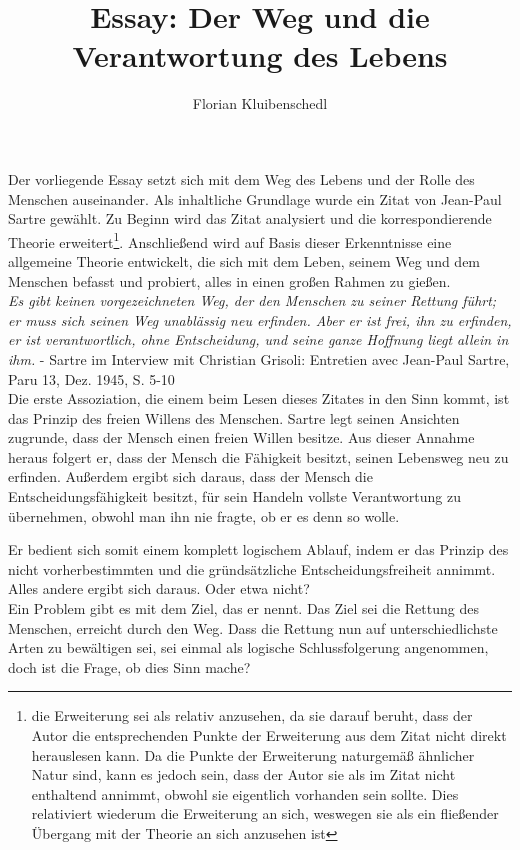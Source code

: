 \documentclass[12pt,a4paper,twoside]{article}
\author{Florian Kluibenschedl}
\title{Essay: Der Weg und die Verantwortung des Lebens}
\begin{document}
  \maketitle
  
  Der vorliegende Essay setzt sich mit dem Weg des Lebens und der Rolle des Menschen auseinander. Als inhaltliche Grundlage wurde ein Zitat von Jean-Paul Sartre gewählt. Zu Beginn wird das Zitat analysiert und die korrespondierende Theorie erweitert\footnote{die Erweiterung sei als relativ anzusehen, da sie darauf beruht, dass der Autor die entsprechenden Punkte der Erweiterung aus dem Zitat nicht direkt herauslesen kann. Da die Punkte der Erweiterung naturgemäß ähnlicher Natur sind, kann es jedoch sein, dass der Autor sie als im Zitat nicht enthaltend annimmt, obwohl sie eigentlich vorhanden sein sollte. Dies relativiert wiederum die Erweiterung an sich, weswegen sie als ein fließender Übergang mit der Theorie an sich anzusehen ist}. Anschließend wird auf Basis dieser Erkenntnisse eine allgemeine Theorie entwickelt, die sich mit dem Leben, seinem Weg und dem Menschen befasst und probiert, alles in einen großen Rahmen zu gießen. \\
  
  \textit{\glqq Es gibt keinen vorgezeichneten Weg, der den Menschen zu seiner Rettung führt; er muss sich seinen Weg unablässig neu erfinden. Aber er ist frei, ihn zu erfinden, er ist verantwortlich, ohne Entscheidung, und seine ganze Hoffnung liegt allein in ihm.\grqq} - Sartre im Interview mit Christian Grisoli: \glqq Entretien avec Jean-Paul Sartre\grqq , Paru 13, Dez. 1945, S. 5-10 \\
  
  Die erste Assoziation, die einem beim Lesen dieses Zitates in den Sinn kommt, ist das Prinzip des freien Willens des Menschen. Sartre legt seinen Ansichten zugrunde, dass der Mensch einen freien Willen besitze. Aus dieser Annahme heraus folgert er, dass der Mensch die Fähigkeit besitzt, seinen Lebensweg neu zu erfinden. Außerdem ergibt sich daraus, dass der Mensch die Entscheidungsfähigkeit besitzt, für sein Handeln vollste Verantwortung zu übernehmen, obwohl man ihn nie fragte, ob er es denn so wolle. 
  
  Er bedient sich somit einem komplett logischem Ablauf, indem er das Prinzip des nicht vorherbestimmten und die gründsätzliche Entscheidungsfreiheit annimmt. Alles andere ergibt sich daraus. Oder etwa nicht? \\
  
  Ein Problem gibt es mit dem Ziel, das er nennt. Das Ziel sei die Rettung des Menschen, erreicht durch den Weg. Dass die Rettung nun auf unterschiedlichste Arten zu bewältigen sei, sei einmal als logische Schlussfolgerung angenommen, doch ist die Frage, ob dies Sinn mache?
  
\end{document}

